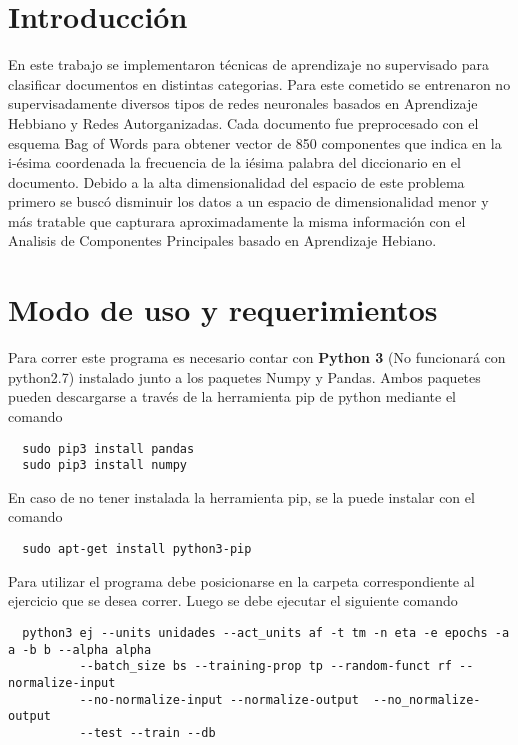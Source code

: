 \section{Introducción}

En este trabajo se implementaron técnicas de aprendizaje no supervisado para
clasificar documentos en distintas categorias. Para este cometido se entrenaron no
supervisadamente diversos tipos de redes neuronales basados en Aprendizaje Hebbiano y
Redes Autorganizadas. Cada documento fue preprocesado con el esquema Bag of
Words para obtener vector de 850 componentes que indica en la i-ésima coordenada
la frecuencia de la iésima palabra del diccionario en el documento.
Debido a la alta dimensionalidad del espacio de este problema primero se buscó
disminuir los datos a un espacio de dimensionalidad menor y más tratable que
capturara aproximadamente la misma información con el Analisis de Componentes
Principales basado en Aprendizaje Hebiano.


\section{Modo de uso y requerimientos}
Para correr este programa es necesario contar con \textbf{Python 3} (No funcionará con python2.7) instalado junto a los paquetes Numpy y Pandas. Ambos paquetes pueden descargarse a través
de la herramienta pip de python mediante el comando
\begin{verbatim}
  sudo pip3 install pandas
  sudo pip3 install numpy
\end{verbatim}
En caso de no tener instalada la herramienta pip, se la puede instalar con el comando
\begin{verbatim}
  sudo apt-get install python3-pip
\end{verbatim}

Para utilizar el programa debe posicionarse en la carpeta correspondiente al ejercicio que se desea correr. Luego se debe ejecutar el siguiente comando
\begin{verbatim}
  python3 ej --units unidades --act_units af -t tm -n eta -e epochs -a a -b b --alpha alpha
          --batch_size bs --training-prop tp --random-funct rf --normalize-input
          --no-normalize-input --normalize-output  --no_normalize-output
          --test --train --db
\end{verbatim}

